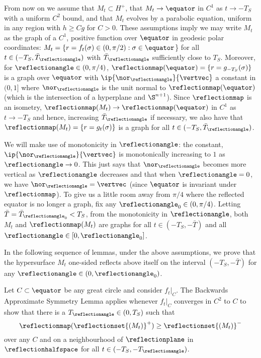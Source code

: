 \documentclass[12pt]{amsart}
\begin{document}
From now on we assume that \(M_t \subset H^+\), that \(M_t \to \equator\) in \(C^1\) as \(t \to -T_S\) with a uniform \(C^2\) bound, and that \(M_t\) evolves by a parabolic equation, uniform in any region with \(h \geq C g\) for \(C>0\). These assumptions imply we may write \(M_t\) as the graph of a \(C^1\), positive function over \(\equator\) in geodesic polar coordinates: \(M_t = \{r = f_t(\sigma) \in (0,\pi/2) : \sigma \in \equator\)\} for all \(t \in (-T_S, \bar{T}_{\reflectionangle})\) with \(\bar{T}_{\reflectionangle}\) sufficiently close to \(T_S\). Moreover, for \(\reflectionangle \in (0,\pi/4)\), \(\reflectionmap(\equator) = \{r = g_{-T_S}(\sigma)\}\) is a graph over \(\equator\) with \(\ip{\nor_{\reflectionangle}}{\vertvec}\) a constant in \((0,1]\) where \(\nor_{\reflectionangle}\) is the unit normal to \(\reflectionmap(\equator)\) (which is the intersection of a hyperplane and \(\S^{n+1}\)). Since \(\reflectionmap\) is an isometry, \(\reflectionmap(M_t) \to \reflectionmap(\equator)\) in \(C^1\) as \(t \to -T_S\) and hence, increasing \(\bar{T}_{\reflectionangle}\) if necessary, we also have that \(\reflectionmap(M_t) = \{r = g_t(\sigma)\}\) is a graph for all \(t \in (-T_S, \bar{T}_{\reflectionangle})\).

We will make use of monotonicity in \(\reflectionangle\): the constant, \(\ip{\nor_{\reflectionangle}}{\vertvec}\) is monotonically increasing to \(1\) as \(\reflectionangle \to 0\). This just says that \(\nor_{\reflectionangle}\) becomes more vertical as \(\reflectionangle\) decreases and that when \(\reflectionangle = 0\), we have \(\nor_{\reflectionangle} = \vertvec\) (since \(\equator\) is invariant under \(\reflectionmap\)). To give us a little room away from \(\pi/4\) where the reflected equator is no longer a graph, fix any \(\reflectionangle_0 \in (0,\pi/4)\). Letting \(\bar{T} = \bar{T}_{\reflectionangle_0} < T_S\), from the monotonicity in \(\reflectionangle\), both \(M_t\) and \(\reflectionmap(M_t)\) are graphs for all \(t \in (-T_S, -\bar{T})\) and all \(\reflectionangle \in [0,\reflectionangle_0]\).

In the following sequence of lemmas, under the above assumptions, we prove that the hypersurface \(M_t\) one-sided reflects above itself on the interval \((-T_S, -\bar{T})\) for any \(\reflectionangle \in (0, \reflectionangle_0)\).

Let \(C\subset \equator\) be any great circle and consider \(f_t|_C\). The Backwards Approximate Symmetry Lemma \cite[Lemma 5.1]{bryanlouie} applies whenever \(f_t|_C\) converges in \(C^2\) to \(C\) to show that there is a \(T_{\reflectionangle} \in (0, T_S)\) such that
\[
\reflectionmap(\reflectionset{(M_t)}^+) \geq \reflectionset{(M_t)}^-
\]
over any \(C\) and on a neighbourhood of \(\reflectionplane\) in \(\reflectionhalfspace\) for all \(t \in (-T_S, -T_{\reflectionangle})\).
\end{document}
